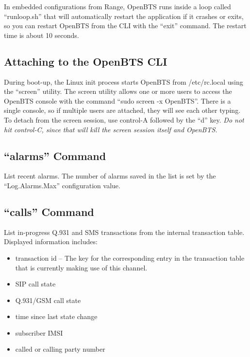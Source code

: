 \documentclass[11pt,openany]{book}
\begin{document}
In embedded configurations from Range, OpenBTS runs inside a loop called ``runloop.sh'' that will automatically restart the application if it crashes or exits, so you can restart OpenBTS from the CLI with the ``exit'' command.  The restart time is about 10 seconds.

\subsection{Attaching to the OpenBTS CLI}
During boot-up, the Linux init process starts OpenBTS from /etc/rc.local using the ``screen'' utility.
The screen utility allows one or more users to access the OpenBTS console with the command ``sudo screen -x OpenBTS''.
There is a single console, so if multiple users are attached, they will see each other typing.
To detach from the screen session, use control-A followed by the ``d'' key.  \emph{Do not hit control-C, since that will kill the screen session itself and OpenBTS.}

\subsection{``alarms'' Command}
\label{sec:alarmsCmd}
List recent alarms.
The number of alarms saved in the list is set by the ``Log.Alarms.Max'' configuration value.

\subsection{``calls'' Command}
\label{sec:callsCmd}
List in-progress Q.931 and SMS transactions from the internal transaction table.
Displayed information includes:
\begin{itemize}
	\item transaction id -- The key for the corresponding entry in the transaction table that is currently making use of this channel.
	\item SIP call state
	\item Q.931/GSM call state
	\item time since last state change
	\item subscriber IMSI
	\item called or calling party number
\end{itemize}
\end{document}
